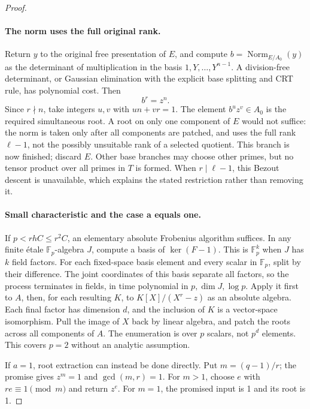 \documentclass[11pt]{article}
\theoremstyle{definition}
\theoremstyle{remark}
\begin{document}
\begin{proof}
\paragraph{The norm uses the full original rank.}
Return \(y\) to the original free presentation of \(E\), and
compute \(b=\operatorname{Norm}_{E/A_0}(y)\) as the determinant
of multiplication in the basis \(1,Y,\ldots,Y^{n-1}\).
A division-free determinant, or Gaussian elimination with the
explicit base splitting and CRT rule, has polynomial cost. Then
\[
                           b^r=z^n.
\]
Since \(r\nmid n\), take integers \(u,v\) with \(un+vr=1\).
The element \(b^u z^v\in A_0\) is the required simultaneous
root. A root on only one component of \(E\) would not suffice:
the norm is taken only after all components are patched, and uses
the full rank \(\ell-1\), not the possibly unsuitable rank of
a selected quotient. This branch is now finished; discard \(E\).
Other base branches may choose other primes, but no tensor product
over all primes in \(T\) is formed. When \(r\mid\ell-1\),
this Bezout descent is unavailable, which explains the stated
restriction rather than removing it.

\paragraph{Small characteristic and the case a equals one.}
If \(p<rhC\le r^2C\), an elementary absolute Frobenius algorithm
suffices. In any finite \'etale \(\mathbb F_p\)-algebra
\(J\), compute a basis of \(\ker(F-1)\). This is
\(\mathbb F_p^k\) when \(J\) has \(k\) field factors.
For each fixed-space basis element and every scalar in
\(\mathbb F_p\), split by their difference. The joint coordinates
of this basis separate all factors, so the process terminates in
fields, in time polynomial in \(p,\dim J,\log p\).
Apply it first to \(A\), then, for each resulting \(K\), to
\(K[X]/(X^r-z)\) as an absolute algebra. Each final factor has
dimension \(d\), and the inclusion of \(K\) is a vector-space
isomorphism. Pull the image of \(X\) back by linear algebra,
and patch the roots across all components of \(A\).
The enumeration is over \(p\) scalars, not \(p^d\) elements.
This covers \(p=2\) without an analytic assumption.

If \(a=1\), root extraction can instead be done directly.
Put \(m=(q-1)/r\); the promise gives \(z^m=1\) and
\(\gcd(m,r)=1\). For \(m>1\), choose \(e\) with
\(re\equiv1\pmod m\) and return \(z^e\). For \(m=1\),
the promised input is 1 and its root is 1.


\end{proof}
\end{document}
